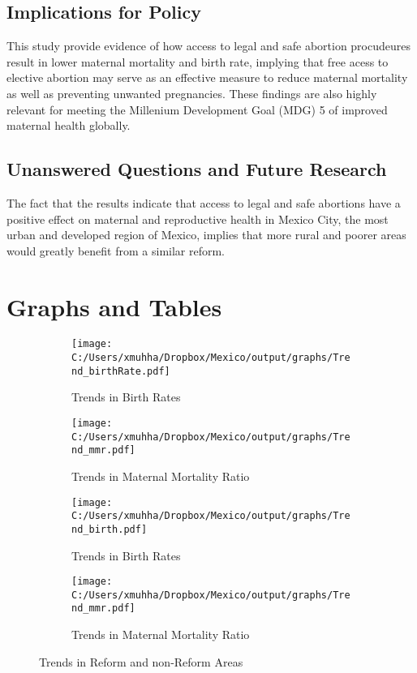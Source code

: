 \documentclass[a4paper, 11pt]{article}
\begin{document}
\begin{spacing}{1.5}
\begin{multicols}{2}
\subsection{Implications for Policy}
This study provide evidence of how access to legal and safe abortion procudeures result in lower maternal mortality and birth rate, implying that free acess to elective abortion may serve as an effective measure to reduce maternal mortality as well as preventing unwanted pregnancies. These findings are also highly relevant for meeting the Millenium Development Goal (MDG) 5 of improved maternal health globally.        
\subsection{Unanswered Questions and Future Research}      	    
The fact that the results indicate that access to legal and safe abortions have a positive effect on maternal and reproductive health in Mexico City, the most urban and developed region of Mexico, implies that more rural and poorer areas would greatly benefit from a similar reform.   
 \newpage
 
 
\end{multicols} 	
\section{Graphs and Tables}
\begin{figure}[htpb!]
	\centering
	\begin{subfigure}{.5\textwidth}
		\centering
		\texttt{[image: C:/Users/xmuhha/Dropbox/Mexico/output/graphs/Trend\_birthRate.pdf]}
		\caption{Trends in Birth Rates}
		\label{birthTrend}
	\end{subfigure}%
	\begin{subfigure}{.5\textwidth}
		\centering
		\texttt{[image: C:/Users/xmuhha/Dropbox/Mexico/output/graphs/Trend\_mmr.pdf]}
		\caption{Trends in Maternal Mortality Ratio}
		\label{mmrTrend}
	\end{subfigure}
	
	\begin{subfigure}{.5\textwidth}
		\centering
		\texttt{[image: C:/Users/xmuhha/Dropbox/Mexico/output/graphs/Trend\_birth.pdf]}
		\caption{Trends in Birth Rates}
		\label{ }
	\end{subfigure}%
	\begin{subfigure}{.5\textwidth}
		\centering
		\texttt{[image: C:/Users/xmuhha/Dropbox/Mexico/output/graphs/Trend\_mmr.pdf]}
		\caption{Trends in Maternal Mortality Ratio}
		\label{ }
	\end{subfigure}
	\caption{Trends in Reform and non-Reform Areas}
	\label{ }
\end{figure}


\end{spacing}
\end{document}
